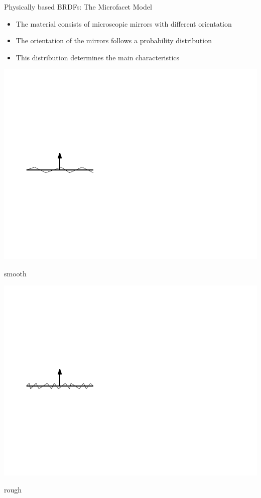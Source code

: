 \documentclass[utf8,stillsansserifmath,fleqn,t]{beamer}
\begin{document}
\begin{frame}[label=materials-microfacet]
\frametitle{\insertsection}
Physically based BRDFs: The Microfacet Model
\begin{itemize}
\item The material consists of microscopic mirrors with different orientation
\item The orientation of the mirrors follows a probability distribution
\item This distribution determines the main characteristics
\end{itemize}
\begin{minipage}{.49\textwidth}
\centerline{\includegraphics[width=\textwidth]{./fig/microfacets-smooth.pdf}}
\centerline{smooth}
\end{minipage}\hfill
\begin{minipage}{.49\textwidth}
\centerline{\includegraphics[width=\textwidth]{./fig/microfacets-rough.pdf}}
\centerline{rough}
\end{minipage}
\end{frame}
\end{document}

